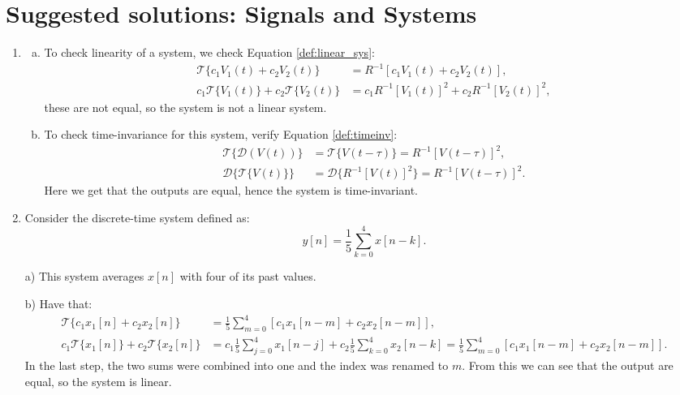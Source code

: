 
\newpage
\section{Suggested solutions: Signals and Systems}
\begin{enumerate}
  \item

        \begin{enumerate}[a)]
          \item To check linearity of a system, we check Equation \ref{def:linear_sys}:
                \begin{align*}
                  \mathcal{T}\{c_{1}V_{1}(t)+c_{2}V_{2}(t)\}                & =R^{-1}[c_{1}V_{1}(t)+c_{2}V_{2}(t)],                   \\
                  c_{1}\mathcal{T}\{V_{1}(t)\}+c_{2}\mathcal{T}\{V_{2}(t)\} & =c_{1}R^{-1}[V_{1}(t)]^{2} + c_{2}R^{-1}[V_{2}(t)]^{2},
                \end{align*}
                these are not equal, so the system is not a linear system.

          \item To check time-invariance for this system, verify Equation \ref{def:timeinv}:
                \begin{align*}
                  \mathcal{T}\{\mathcal{D}(V(t))\}   & =\mathcal{T}\{V(t-\tau)\}=R^{-1}[V(t-\tau)]^{2},        \\
                  \mathcal{D}\{\mathcal{T}\{V(t)\}\} & =\mathcal{D}\{R^{-1}[V(t)]^{2}\}=R^{-1}[V(t-\tau)]^{2}.
                \end{align*}
                Here we get that the outputs are equal, hence the system is time-invariant.
        \end{enumerate}

  \item
        Consider the discrete-time system defined as:
        \[ y[n]=\frac{1}{5}\sum_{k=0}^{4}x[n-k]. \]

  \item[a)]
        This system averages $x[n]$ with four of its past values.

  \item[b)] Have that:
        \begin{align*}
          \mathcal{T}\{c_{1}x_{1}[n]+c_{2}x_{2}[n]\}                & = \frac{1}{5}\sum_{m=0}^{4}[c_{1}x_{1}[n-m]+c_{2}x_{2}[n-m]],                      \\
          c_{1}\mathcal{T}\{x_{1}[n]\}+c_{2}\mathcal{T}\{x_{2}[n]\} & =c_{1}\frac{1}{5}\sum_{j=0}^{4}x_{1}[n-j]+c_{2}\frac{1}{5}\sum_{k=0}^{4}x_{2}[n-k]
          =\frac{1}{5}\sum_{m=0}^{4}[c_{1}x_{1}[n-m]+c_{2}x_{2}[n-m]].
        \end{align*}
        In the last step, the two sums were combined into one and the index was renamed to $m$.
        From this we can see that the output are equal, so the system is linear.


\end{enumerate}
